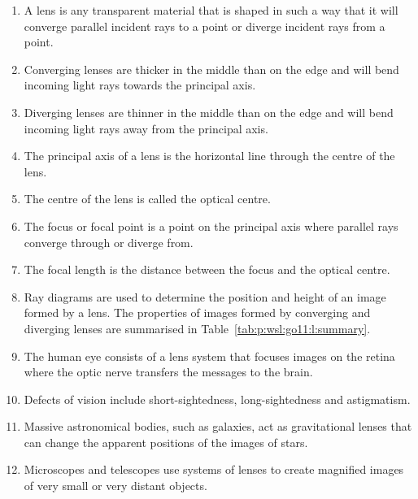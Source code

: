 \begin{enumerate}
\item A lens is any transparent material that is shaped in such a way that it will converge parallel incident rays to a point or diverge incident rays from a point.
\item Converging lenses are thicker in the middle than on the edge and will bend incoming light rays towards the principal axis.
\item Diverging lenses are thinner in the middle than on the edge and will bend incoming light rays away from the principal axis.
\item The principal axis of a lens is the horizontal line through the centre of the lens.
\item The centre of the lens is called the optical centre.
\item The focus or focal point is a point on the principal axis where parallel rays converge through or diverge from.
\item The focal length is the distance between the focus and the optical centre.
\item Ray diagrams are used to determine the position and height of an image formed by a lens. The properties of images formed by converging and diverging lenses are summarised in Table~\ref{tab:p:wsl:go11:l:summary}.
\item The human eye consists of a lens system that focuses images on the retina where the optic nerve transfers the messages to the brain.
\item Defects of vision include short-sightedness, long-sightedness and astigmatism.
\item Massive astronomical bodies, such as galaxies, act as gravitational lenses that can change the apparent positions of the images of stars.
\item Microscopes and telescopes use systems of lenses to create magnified images of very small or very distant objects.
\end{enumerate}


